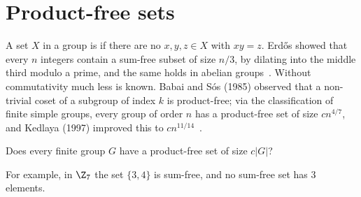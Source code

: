 \section{Product-free sets}\label{sec:product-free}

A set $X$ in a group is  if there are no $x,y,z\in X$ with $xy=z$. Erd\H{o}s showed that every $n$ integers contain a sum-free subset of size $n/3$, by dilating into the middle third modulo a prime, and the same holds in abelian groups~\cite[\S1]{gow08}. Without commutativity much less is known. Babai and S\'os (1985) observed that a non-trivial coset of a subgroup of index $k$ is product-free; via the classification of finite simple groups, every group of order $n$ has a product-free set of size $cn^{4/7}$, and Kedlaya (1997) improved this to $cn^{11/14}$~\cite[\S1]{gow08}.

\begin{problem}\label{prob:product-free}
Does every finite group $G$ have a product-free set of size $c|G|$?
\end{problem}

For example, in $\Z_7$ the set $\{3,4\}$ is sum-free, and no sum-free set has $3$ elements.

